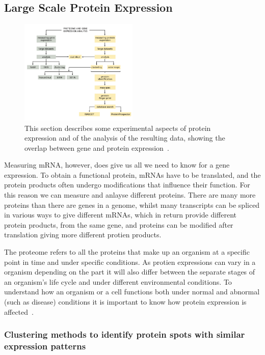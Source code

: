 \documentclass{report}
\begin{document}
\subsection{Large Scale Protein Expression}

\begin{figure}[H]
    \centering
    \includegraphics[width=0.5\textwidth]{Overlaping.png}
    \caption{\label{fig:Overlaping}This section describes some experimental aspects of protein expression and of the analysis of the resulting data, showing the overlap between gene and protein expression~\cite{zvelebil_understanding_2008}.}
\end{figure}

Measuring mRNA, however, does give us all we need to know for a gene expression. To obtain a functional protein, mRNAs have to be translated, and the protein products often undergo modifications that influence their function. For this reason we can measure and anlayse different proteins. There are many more proteins than there are genes in a genome, whilst many transcripts can be spliced in various ways to give different mRNAs, which in return provide different protein products, from the same gene, and proteins can be modified after translation giving more different protien products.

The proteome refers to all the proteins that make up an organism at a specific point in time and under specific conditions. As protien expressions can vary in a organism depending on the part it will also differ between the separate stages of an organism’s life cycle and under different environmental conditions. To understand how an organism or a cell functions both under normal and abnormal (such as disease) conditions it is important to know how protein expression is affected~\cite{zvelebil_understanding_2008}.

\subsubsection{Clustering methods to identify protein spots with similar expression patterns}
\end{document}
